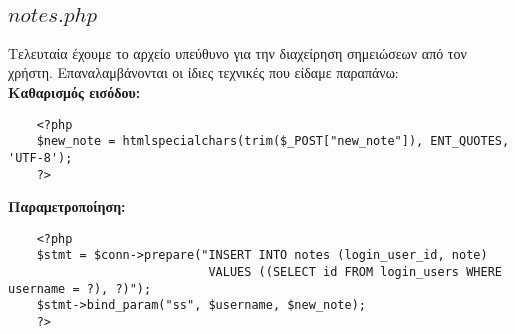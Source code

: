 \documentclass{report}
\begin{document}
\subsection*{$notes.php$}
Τελευταία έχουμε το αρχείο υπεύθυνο για την διαχείρηση σημειώσεων από τον χρήστη. Επαναλαμβάνονται 
οι ίδιες τεχνικές που είδαμε παραπάνω:\\
\textbf{Καθαρισμός εισόδου:}
\begin{verbatim}
    <?php
    $new_note = htmlspecialchars(trim($_POST["new_note"]), ENT_QUOTES, 'UTF-8');
    ?>
\end{verbatim}
\textbf{Παραμετροποίηση:}
\begin{verbatim}
    <?php
    $stmt = $conn->prepare("INSERT INTO notes (login_user_id, note) 
                            VALUES ((SELECT id FROM login_users WHERE username = ?), ?)");
    $stmt->bind_param("ss", $username, $new_note);
    ?>
\end{verbatim}
\end{document}
